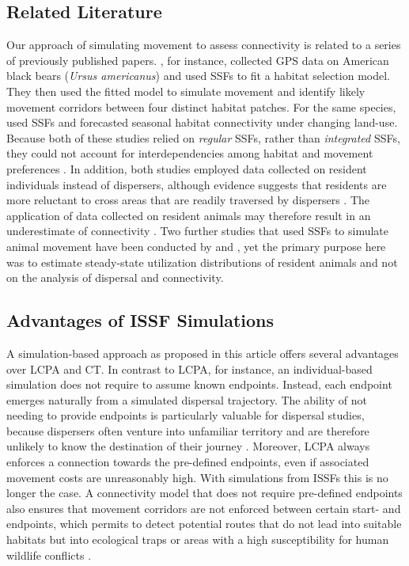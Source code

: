 \documentclass[abstract=on,10pt,a4paper,bibliography=totocnumbered]{article}
\begin{document}
\subsection{Related Literature}
Our approach of simulating movement to assess connectivity is related to a
series of previously published papers. \cite{Clark.2015}, for instance,
collected GPS data on American black bears (\textit{Ursus americanus}) and used
SSFs to fit a habitat selection model. They then used the fitted model to
simulate movement and identify likely movement corridors between four distinct
habitat patches. For the same species, \cite{Zeller.2020} used SSFs and
forecasted seasonal habitat connectivity under changing land-use. Because both
of these studies relied on \textit{regular} SSFs, rather than
\textit{integrated} SSFs, they could not account for interdependencies among
habitat and movement preferences \citep{Avgar.2016}. In addition, both studies
employed data collected on resident individuals instead of dispersers, although
evidence suggests that residents are more reluctant to cross areas that are
readily traversed by dispersers \citep{Elliot.2014, Gaston.2016, Abrahms.2017,
Keeley.2017}. The application of data collected on resident animals may
therefore result in an underestimate of connectivity \citep{Elliot.2014}. Two
further studies that used SSFs to simulate animal movement have been conducted
by \cite{Potts.2013} and \cite{Signer.2017}, yet the primary purpose here was to
estimate steady-state utilization distributions of resident animals and not on
the analysis of dispersal and connectivity.

\subsection{Advantages of ISSF Simulations}
A simulation-based approach as proposed in this article offers several
advantages over LCPA and CT. In contrast to LCPA, for instance, an
individual-based simulation does not require to assume known endpoints. Instead,
each endpoint emerges naturally from a simulated dispersal trajectory. The
ability of not needing to provide endpoints is particularly valuable for
dispersal studies, because dispersers often venture into unfamiliar territory
and are therefore unlikely to know the destination of their journey
\citep{Elliot.2014, Abrahms.2017, Cozzi.2020}. Moreover, LCPA always enforces a
connection towards the pre-defined endpoints, even if associated movement costs
are unreasonably high. With simulations from ISSFs this is no longer the case. A
connectivity model that does not require pre-defined endpoints also ensures that
movement corridors are not enforced between certain start- and endpoints, which
permits to detect potential routes that do not lead into suitable habitats but
into ecological traps \citep{Dwernychuk.1972, VanDerMeer.2014} or areas with a
high susceptibility for human wildlife conflicts \citep{Cushman.2018}.
\end{document}
